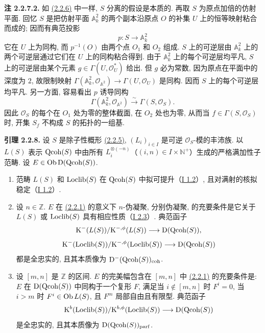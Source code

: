 \textbf{注 2.2.7.2.} 如 \hyperlink{sga6.e02.lem.2-2-6}{(2.2.6)} 中一样, $S$ 分离的假设是本质的. 再取 $S$ 为原点加倍的仿射平面. 回忆 $S$ 是把仿射平面 $\mathbb A^2_k$ 的两个副本沿原点 $O$ 的补集 $U$ 上的恒等映射粘合而成的; 因而有典范投影
\[
p:S\longrightarrow\mathbb A^2_k
\]
它在 $U$ 上为同构, 而 $p^{-1}(O)$ 由两个点 $O_1$ 和 $O_2$ 组成. $S$ 上的可逆层由 $\mathbb A^2_k$ 上的两个可逆层通过它们在 $U$ 上的同构粘合得到. 由于 $\mathbb A^2_k$ 上的每个可逆层均平凡, $S$ 上的可逆层由某个元素 $g\in\Gamma(U,\mathcal O_U^*)$ 给出. 但 $g$ 必为常数, 因为原点在平面中的深度为 $2$, 故限制映射 $\Gamma(\mathbb A^2_k,\mathcal O_{\mathbb A^2})\to\Gamma(U,\mathcal O_U)$ 是同构. 因而 $S$ 上的每个可逆层均平凡. 另一方面, 容易看出 $p$ 诱导同构
\[
\Gamma(\mathbb A^2_k,\mathcal O_{\mathbb A^2})\xrightarrow{\sim}\Gamma(S,\mathcal O_S).
\]
因此 $\mathcal O_S$ 的每个在 $O_1$ 处为零的整体截面, 在 $O_2$ 处也为零, 从而当 $f\in\Gamma(S,\mathcal O_S)$ 时, 开集 $S_f$ 不构成 $S$ 的拓扑的一组基.

\textbf{引理 2.2.8.} 设 $S$ 是除子性概形 \hyperlink{sga6.e02.def.2-2-5}{(2.2.5)}, $(L_i)_{i\in I}$ 是可逆 $\mathcal O_S$-模的丰沛族. 以 $L(S)$ 表示 $\operatorname{Qcoh}(S)$ 中由所有 $L_i^{\otimes(-n)}$（$(i,n)\in I\times\mathbb N^{+}$）生成的严格满加性子范畴. 设 $E\in\operatorname{Ob}\mathrm D(\operatorname{Qcoh}(S))$.
\begin{enumerate}[label=\alph*)]
\item 范畴 $L(S)$ 和 $\operatorname{Loclib}(S)$ 在 $\operatorname{Qcoh}(S)$ 中拟可提升（\hyperlink{sga6.e01.sec.1.2}{I 1.2}）, 且对满射的核拟稳定（\hyperlink{sga6.e01.sec.1.2}{I 1.2}）.
\item 设 $n\in\mathbb Z$. $E$ 在 \hyperlink{sga6.e02.notation.2-2-1}{(2.2.1)} 的意义下 $n$-伪凝聚, 分别伪凝聚, 的充要条件是它关于 $L(S)$ 或 $\operatorname{Loclib}(S)$ 具有相应性质（\hyperlink{sga6.e01.def.2-3}{I 2.3}）. 典范函子
\[
\mathrm K^{-}(L(S))/\mathrm K^{-,\phi}(L(S))\longrightarrow \mathrm D(\operatorname{Qcoh}(S)),
\]
\[
\mathrm K^{-}(\operatorname{Loclib}(S))/\mathrm K^{-,\phi}(\operatorname{Loclib}(S))\longrightarrow \mathrm D(\operatorname{Qcoh}(S))
\]
都是全忠实的, 且其本质像为 $\mathrm D^{-}(\operatorname{Qcoh}(S))_{\mathrm{coh}}$.
\item 设 $[m,n]$ 是 $\mathbb Z$ 的区间. $E$ 的完美幅包含在 $[m,n]$ 中 \hyperlink{sga6.e02.notation.2-2-1}{(2.2.1)} 的充要条件是: $E$ 在 $\mathrm D(\operatorname{Qcoh}(S))$ 中同构于一个复形 $F$, 满足当 $i\notin[m,n]$ 时 $F^i=0$, 当 $i>m$ 时 $F^i\in\operatorname{Ob} L(S)$, 且 $F^m$ 局部自由且有限型. 典范函子
\[
\mathrm K^b(\operatorname{Loclib}(S))/\mathrm K^{b,\phi}(\operatorname{Loclib}(S))\longrightarrow \mathrm D(\operatorname{Qcoh}(S))
\]
是全忠实的, 且其本质像为 $\mathrm D(\operatorname{Qcoh}(S))_{\mathrm{parf}}$.
\end{enumerate}

